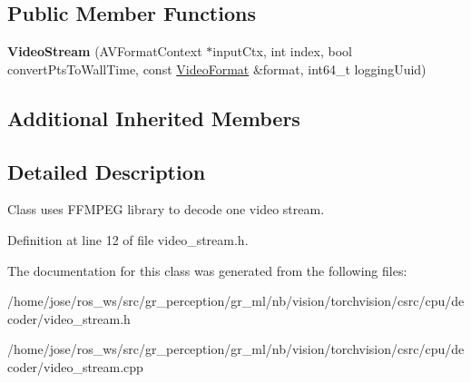 \subsection*{Public Member Functions}
\begin{DoxyCompactItemize}
\item 
\mbox{\label{classffmpeg_1_1VideoStream_a275c1486156d9aaabcf7d4212023f5dc}} 
{\bfseries Video\+Stream} (A\+V\+Format\+Context $\ast$input\+Ctx, int index, bool convert\+Pts\+To\+Wall\+Time, const \hyperlink{structffmpeg_1_1VideoFormat}{Video\+Format} \&format, int64\+\_\+t logging\+Uuid)
\end{DoxyCompactItemize}
\subsection*{Additional Inherited Members}


\subsection{Detailed Description}
Class uses F\+F\+M\+P\+EG library to decode one video stream. 

Definition at line 12 of file video\+\_\+stream.\+h.



The documentation for this class was generated from the following files\+:\begin{DoxyCompactItemize}
\item 
/home/jose/ros\+\_\+ws/src/gr\+\_\+perception/gr\+\_\+ml/nb/vision/torchvision/csrc/cpu/decoder/video\+\_\+stream.\+h\item 
/home/jose/ros\+\_\+ws/src/gr\+\_\+perception/gr\+\_\+ml/nb/vision/torchvision/csrc/cpu/decoder/video\+\_\+stream.\+cpp\end{DoxyCompactItemize}

